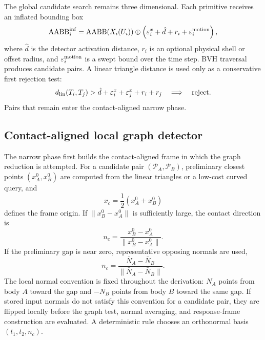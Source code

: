 \documentclass[preprint,12pt]{elsarticle}
\newcommand{\Pc}{\mathcal{P}}
\newcommand{\eps}{\varepsilon}
\begin{document}
The global candidate search remains three dimensional. Each primitive receives an inflated bounding box
\begin{equation}
    \operatorname{AABB}_i^{\rm inf}
    =\operatorname{AABB}(X_i(U_i))\oplus
    \left(\eps_i^x+\hat d+r_i+\eps_i^{\rm motion}\right),
    \label{eq:inflated_aabb}
\end{equation}
where $\hat d$ is the detector activation distance, $r_i$ is an optional physical shell or offset radius, and $\eps_i^{\rm motion}$ is a swept bound over the time step. BVH traversal produces candidate pairs. A linear triangle distance is used only as a conservative first rejection test:
\begin{equation}
    d_{\rm lin}(T_i,T_j)>\hat d+\eps_i^x+\eps_j^x+r_i+r_j
    \quad\Longrightarrow\quad \text{reject}.
\end{equation}
Pairs that remain enter the contact-aligned narrow phase.

\subsection{Contact-aligned local graph detector}

The narrow phase first builds the contact-aligned frame in which the graph reduction is attempted.
\label{subsec:contact_frame}
For a candidate pair $(\Pc_A,\Pc_B)$, preliminary closest points $(x_A^0,x_B^0)$ are computed from the linear triangles or a low-cost curved query, and
\begin{equation}
    x_c=\frac{1}{2}(x_A^0+x_B^0)
\end{equation}
defines the frame origin. If $\|x_B^0-x_A^0\|$ is sufficiently large, the contact direction is
\begin{equation}
    n_c=\frac{x_B^0-x_A^0}{\|x_B^0-x_A^0\|}.
    \label{eq:contact_normal_from_gap}
\end{equation}
If the preliminary gap is near zero, representative opposing normals are used,
\begin{equation}
    n_c=\frac{\bar N_A-\bar N_B}{\|\bar N_A-\bar N_B\|}.
    \label{eq:contact_normal_from_normals}
\end{equation}
The local normal convention is fixed throughout the derivation: $N_A$ points from body $A$ toward the gap and $-N_B$ points from body $B$ toward the same gap. If stored input normals do not satisfy this convention for a candidate pair, they are flipped locally before the graph test, normal averaging, and response-frame construction are evaluated. A deterministic rule chooses an orthonormal basis $(t_1,t_2,n_c)$.
\end{document}
